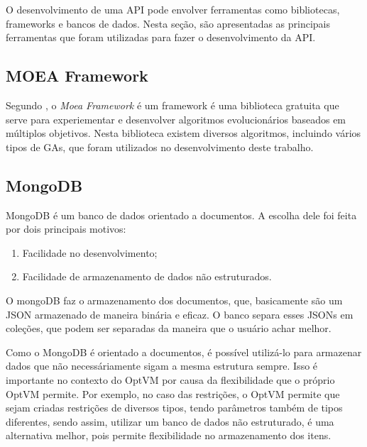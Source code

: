 O desenvolvimento de uma API pode envolver ferramentas como bibliotecas, frameworks e 
bancos de dados. Nesta seção, são apresentadas as principais ferramentas que foram utilizadas para
fazer o desenvolvimento da API. 

\subsection{MOEA Framework}
Segundo \cite{moea}, o \textit{Moea Framework} é um framework é uma
biblioteca gratuita que serve para experiementar e desenvolver
algoritmos evolucionários baseados em múltiplos objetivos. Nesta biblioteca
existem diversos algoritmos, incluindo vários tipos de GAs, que foram utilizados
no desenvolvimento deste trabalho.

\subsection{MongoDB}
MongoDB é um banco de dados orientado a documentos. A escolha dele foi
feita por dois principais motivos:

\begin{enumerate}
  \item Facilidade no desenvolvimento;
  \item Facilidade de armazenamento de dados não estruturados.
\end{enumerate}

O mongoDB faz o armazenamento dos documentos, que, basicamente são um JSON
armazenado de maneira binária e eficaz. O banco separa esses JSONs em coleções,
que podem ser separadas da maneira que o usuário achar melhor.

Como o MongoDB é orientado a documentos, é possível utilizá-lo para armazenar
dados que não necessáriamente sigam a mesma estrutura sempre. Isso é importante no contexto do
OptVM por causa da flexibilidade que o próprio OptVM permite. Por exemplo, no
caso das restrições, o OptVM permite que sejam criadas restrições de diversos tipos,
tendo parâmetros também de tipos diferentes, sendo assim, utilizar um banco de 
dados não estruturado, é uma alternativa melhor, pois permite flexibilidade no armazenamento
dos itens.

